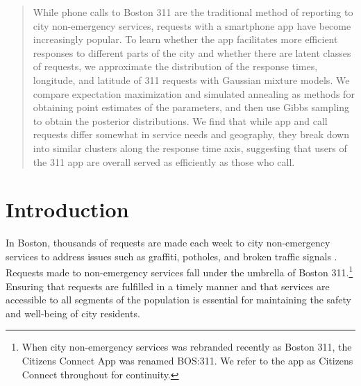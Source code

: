 \documentclass[twoside]{article}
\theoremstyle{theorem}
\theoremstyle{theorem}
\theoremstyle{theorem}
\theoremstyle{lemma}
\theoremstyle{definition}
\theoremstyle{example}
\begin{document}

\makeatletter
\def\BState{\State\hskip-\ALG@thistlm}
\makeatother
%

%


\begin{abstract}
While phone calls to Boston 311 are the traditional method of reporting to city non-emergency services, requests with a smartphone app have become increasingly popular. To learn whether the app facilitates more efficient responses to different parts of the city and whether there are latent classes of requests, we approximate the distribution of the response times, longitude, and latitude of 311 requests with Gaussian mixture models. We compare expectation maximization and simulated annealing as methods for obtaining point estimates of the parameters, and then use Gibbs sampling to obtain the posterior distributions. We find that while app and call requests differ somewhat in service needs and geography, they break down into similar clusters along the response time axis, suggesting that users of the 311 app are overall served as efficiently as those who call. 
\end{abstract}
\section{Introduction}
In Boston, thousands of requests are made each week to city non-emergency services to address issues such as graffiti, potholes, and broken traffic signals \cite{walshpressrelease}. Requests made to non-emergency services fall under the umbrella of Boston 311.\footnote{When city non-emergency services was rebranded recently as Boston 311, the Citizens Connect App was renamed BOS:311. We refer to the app as Citizens Connect throughout for continuity.} Ensuring that requests are fulfilled in a timely manner and that services are accessible to all segments of the population is essential for maintaining the safety and well-being of city residents. 
\end{document}
